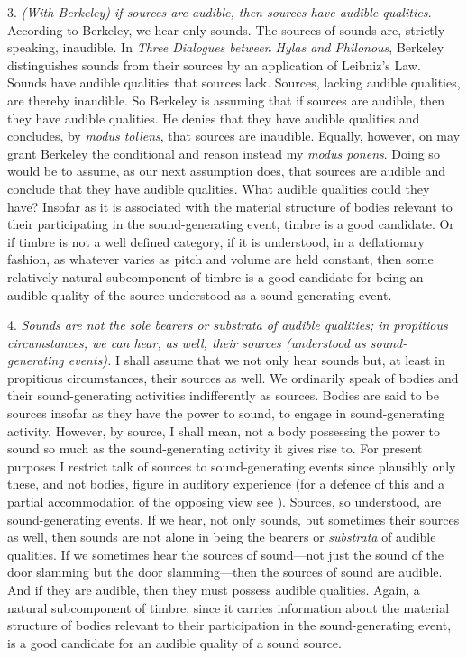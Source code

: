\documentclass[12pt]{article}
\begin{document}
3. \emph{(With Berkeley) if sources are audible, then sources have audible qualities.} According to Berkeley, we hear only sounds. The sources of sounds are, strictly speaking, inaudible. In \emph{Three Dialogues between Hylas and Philonous}, Berkeley distinguishes sounds from their sources by an application of Leibniz's Law. Sounds have audible qualities that sources lack. Sources, lacking audible qualities, are thereby inaudible. So Berkeley is assuming that if sources are audible, then they have audible qualities. He denies that they have audible qualities and concludes, by \emph{modus tollens}, that sources are inaudible. Equally, however, on may grant Berkeley the conditional and reason instead my \emph{modus ponens}. Doing so would be to assume, as our next assumption does, that sources are audible and conclude that they have audible qualities. What audible qualities could they have? Insofar as it is associated with the material structure of bodies  relevant to their participating in the sound-generating event, timbre is a good candidate. Or if timbre is not a well defined category, if it is understood, in a deflationary fashion, as whatever varies as pitch and volume are held constant, then some relatively natural subcomponent of timbre is a good candidate for being an audible quality of the source understood as a sound-generating event.

4. \emph{Sounds are not the sole bearers or \emph{substrata} of audible qualities; in propitious circumstances, we can hear, as well, their sources (understood as sound-generating events).} I shall assume that we not only hear sounds but, at least in propitious circumstances, their sources as well. We ordinarily speak of bodies and their sound-generating activities indifferently as sources. Bodies are said to be sources insofar as they have the power to sound, to engage in sound-generating activity. However, by source, I shall mean, not a body possessing the power to sound so much as the sound-generating activity it gives rise to. For present purposes I restrict talk of sources to sound-generating events since plausibly only these, and not bodies, figure in auditory experience (for a defence of this and a partial accommodation of the opposing view see \citealt[chapter 3.4]{Kalderon:2018oe}). Sources, so understood, are sound-generating events. If we hear, not only sounds, but sometimes their sources as well, then sounds are not alone in being the bearers or \emph{substrata} of audible qualities. If we sometimes hear the sources of sound---not just the sound of the door slamming but the door slamming---then the sources of sound are audible. And if they are audible, then they must possess audible qualities. Again, a natural subcomponent of timbre, since it carries information about the material structure of bodies relevant to their participation in the sound-generating event, is a good candidate for an audible quality of a sound source.
\end{document}
